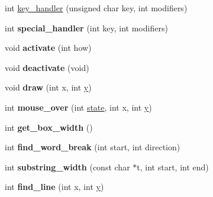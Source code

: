 \begin{DoxyCompactItemize}
\item 
int \hyperlink{class_g_l_u_i___list_a0d88a6b7a1c479420b85f246d3042d86}{key\+\_\+handler} (unsigned char key, int modifiers)
\item 
\hypertarget{class_g_l_u_i___list_a47649c2517c82edecd2f7376a284e1b6}{int {\bfseries special\+\_\+handler} (int key, int modifiers)}\label{class_g_l_u_i___list_a47649c2517c82edecd2f7376a284e1b6}

\item 
\hypertarget{class_g_l_u_i___list_a27aad35685565ffae7182b432dbfb2d6}{void {\bfseries activate} (int how)}\label{class_g_l_u_i___list_a27aad35685565ffae7182b432dbfb2d6}

\item 
\hypertarget{class_g_l_u_i___list_a862ebf586380a13b1e17bf00ee06cc40}{void {\bfseries deactivate} (void)}\label{class_g_l_u_i___list_a862ebf586380a13b1e17bf00ee06cc40}

\item 
\hypertarget{class_g_l_u_i___list_a9cecff476afad9849416acaf568d8f1a}{void {\bfseries draw} (int x, int \hyperlink{_ice_utils_8h_aa7ffaed69623192258fb8679569ff9ba}{y})}\label{class_g_l_u_i___list_a9cecff476afad9849416acaf568d8f1a}

\item 
\hypertarget{class_g_l_u_i___list_a9946699ea4a63516620440dc9cb503f5}{int {\bfseries mouse\+\_\+over} (int \hyperlink{structstate}{state}, int x, int \hyperlink{_ice_utils_8h_aa7ffaed69623192258fb8679569ff9ba}{y})}\label{class_g_l_u_i___list_a9946699ea4a63516620440dc9cb503f5}

\item 
\hypertarget{class_g_l_u_i___list_a08c3ad15db735454006faa1dcba6f461}{int {\bfseries get\+\_\+box\+\_\+width} ()}\label{class_g_l_u_i___list_a08c3ad15db735454006faa1dcba6f461}

\item 
\hypertarget{class_g_l_u_i___list_a1ca6f966a881d67dc039c6d6fc0e8f15}{int {\bfseries find\+\_\+word\+\_\+break} (int start, int direction)}\label{class_g_l_u_i___list_a1ca6f966a881d67dc039c6d6fc0e8f15}

\item 
\hypertarget{class_g_l_u_i___list_a305864cc3614e17a6ef47e5989c8cd21}{int {\bfseries substring\+\_\+width} (const char $\ast$t, int start, int end)}\label{class_g_l_u_i___list_a305864cc3614e17a6ef47e5989c8cd21}

\item 
\hypertarget{class_g_l_u_i___list_a3315c82b5aef8f476de85ea90d2a8421}{int {\bfseries find\+\_\+line} (int x, int \hyperlink{_ice_utils_8h_aa7ffaed69623192258fb8679569ff9ba}{y})}\label{class_g_l_u_i___list_a3315c82b5aef8f476de85ea90d2a8421}


\end{DoxyCompactItemize}
